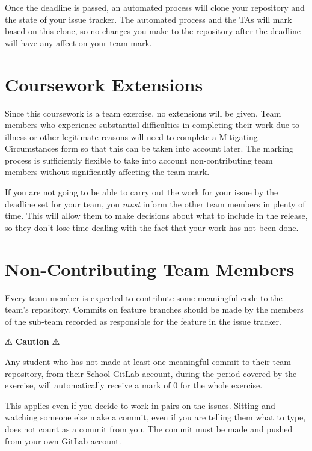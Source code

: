 \documentclass[
]{book}
\begin{document}
Once the deadline is passed, an automated process will clone your repository and the state of your issue tracker. The automated process and the TAs will mark based on this clone, so no changes you make to the repository after the deadline will have any affect on your team mark.

\hypertarget{xtensions}{%
\section{Coursework Extensions}\label{xtensions}}

Since this coursework is a team exercise, no extensions will be given. Team members who experience substantial difficulties in completing their work due to illness or other legitimate reasons will need to complete a Mitigating Circumstances form so that this can be taken into account later. The marking process is sufficiently flexible to take into account non-contributing team members without significantly affecting the team mark.

If you are not going to be able to carry out the work for your issue by the deadline set for your team, you \emph{must} inform the other team members in plenty of time. This will allow them to make decisions about what to include in the release, so they don't lose time dealing with the fact that your work has not been done.

\hypertarget{nctm}{%
\section{Non-Contributing Team Members}\label{nctm}}

Every team member is expected to contribute some meaningful code to the team's repository. Commits on feature branches should be made by the members of the sub-team recorded as responsible for the feature in the issue tracker.

⚠️ \textbf{Caution} ⚠️

Any student who has not made at least one meaningful commit to their team repository, from their School GitLab account, during the period covered by the exercise, will automatically receive a mark of 0 for the whole exercise.

This applies even if you decide to work in pairs on the issues. Sitting and watching someone else make a commit, even if you are telling them what to type, does not count as a commit from you. The commit must be made and pushed from your own GitLab account.
\end{document}
